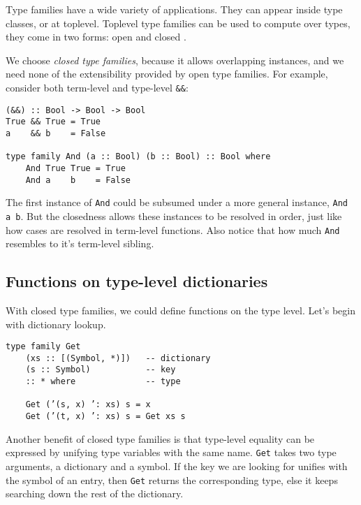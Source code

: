 \documentclass[pldi]{sigplanconf-pldi16}
\begin{document}
Type families have a wide variety of applications. They can appear inside type
 classes\cite{tfclass}\cite{tfsynonym}, or at toplevel. Toplevel type families
 can be used to compute over types, they come in two forms: open\cite{tfopen}
 and closed \cite{tfclosed}.

We choose \emph{closed type families}, because it allows overlapping instances,
 and we need none of the extensibility provided by open type families.
For example, consider both term-level and type-level \texttt{&&}:

\begin{verbatim}
(&&) :: Bool -> Bool -> Bool
True && True = True
a    && b    = False

type family And (a :: Bool) (b :: Bool) :: Bool where
    And True True = True
    And a    b    = False
\end{verbatim}

The first instance of \texttt{And} could be subsumed under a more
 general instance, \texttt{And a b}.
But the closedness allows these instances to be resolved in order, just like
 how cases are resolved in term-level functions. Also notice that how much
 \texttt{And} resembles to it's term-level sibling.

\subsection{Functions on type-level dictionaries}

With closed type families, we could define functions on the type level.
 Let's begin with dictionary lookup.

\begin{verbatim}
type family Get
    (xs :: [(Symbol, *)])   -- dictionary
    (s :: Symbol)           -- key
    :: * where              -- type

    Get (’(s, x) ’: xs) s = x
    Get (’(t, x) ’: xs) s = Get xs s
\end{verbatim}

Another benefit of closed type families is that type-level equality can be
expressed by unifying type variables with the same name.
\texttt{Get} takes two type arguments, a dictionary and a symbol.
If the key we are looking for unifies with the symbol of an entry, then
 \texttt{Get} returns the corresponding type, else it keeps
 searching down the rest of the dictionary.
\end{document}
